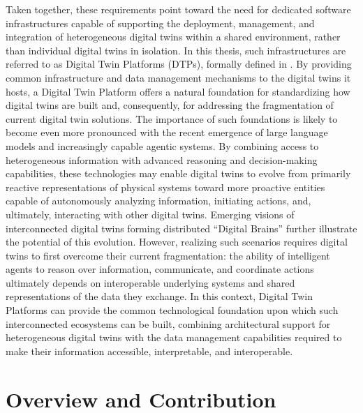 Taken together, these requirements point toward the need for dedicated software infrastructures capable of supporting the deployment, management, and integration of heterogeneous digital twins within a shared environment, rather than individual digital twins in isolation.
%
In this thesis, such infrastructures are referred to as Digital Twin Platforms (DTPs), formally defined in .
%
By providing common infrastructure and data management mechanisms to the digital twins it hosts, a Digital Twin Platform offers a natural foundation for standardizing how digital twins are built and, consequently, for addressing the fragmentation of current digital twin solutions.
%
The importance of such foundations is likely to become even more pronounced with the recent emergence of large language models and increasingly capable agentic systems.
%
By combining access to heterogeneous information with advanced reasoning and decision-making capabilities, these technologies may enable digital twins to evolve from primarily reactive representations of physical systems toward more proactive entities capable of autonomously analyzing information, initiating actions, and, ultimately, interacting with other digital twins.
%
Emerging visions of interconnected digital twins forming distributed ``Digital Brains'' further illustrate the potential of this evolution.
%
However, realizing such scenarios requires digital twins to first overcome their current fragmentation: the ability of intelligent agents to reason over information, communicate, and coordinate actions ultimately depends on interoperable underlying systems and shared representations of the data they exchange.
%
In this context, Digital Twin Platforms can provide the common technological foundation upon which such interconnected ecosystems can be built, combining architectural support for heterogeneous digital twins with the data management capabilities required to make their information accessible, interpretable, and interoperable.

\section*{Overview and Contribution}

